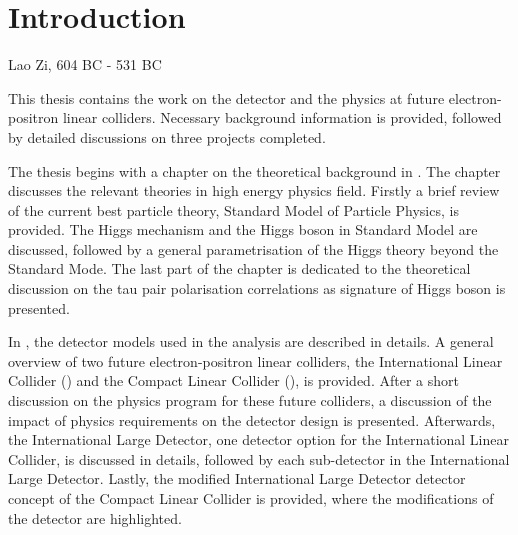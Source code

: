 \chapter{Introduction}
\label{chap:Introduction}



%
{Lao Zi, 604 BC - 531 BC}%



This thesis contains the work  on the detector and the physics at future electron-positron linear colliders. Necessary background information is provided, followed by detailed discussions on three projects completed.

The thesis begins with a chapter on the theoretical background in . The chapter discusses the relevant theories in  high energy physics field. Firstly a brief review of the   current best particle theory, Standard Model of Particle Physics, is provided. The Higgs mechanism and the Higgs boson in Standard Model are discussed, followed by a general parametrisation of the Higgs theory beyond the Standard Mode. The last part of the chapter is dedicated to the theoretical discussion on the tau pair polarisation correlations as signature of Higgs boson is presented.

In , the detector models used in the analysis are described in details. A general overview of two future electron-positron linear colliders, the International Linear Collider (\ILC) and the Compact Linear Collider (\CLIC), is provided. After a short discussion on the physics program for these future colliders, a discussion of the impact of physics requirements on the detector design is presented. Afterwards, the International Large Detector, one detector option for the International Linear Collider, is discussed in details, followed by each sub-detector in the International Large Detector. Lastly, the modified International Large Detector detector concept of the Compact Linear Collider is provided, where the modifications of the detector are highlighted.

